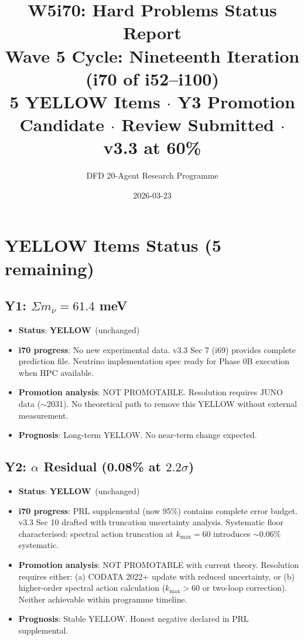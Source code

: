\documentclass[11pt,a4paper]{article}
\title{\Large W5i70: Hard Problems Status Report\\[6pt]
\normalsize Wave 5 Cycle: Nineteenth Iteration (i70 of i52--i100)\\[6pt]
5 YELLOW Items $\cdot$ Y3 Promotion Candidate $\cdot$ Review Submitted $\cdot$ v3.3 at 60\%}
\author{DFD 20-Agent Research Programme}
\date{2026-03-23}
\newcommand{\YELLOW}{\textcolor{dfdyellow}{\textbf{YELLOW}}}
\begin{document}
\maketitle

\section{YELLOW Items Status (5 remaining)}

\subsection{Y1: $\Sigma m_\nu = 61.4$ meV}
\begin{itemize}[nosep]
\item \textbf{Status}: \YELLOW\ (unchanged)
\item \textbf{i70 progress}: No new experimental data. v3.3 Sec 7 (i69) provides complete prediction file. Neutrino implementation spec ready for Phase 0B execution when HPC available.
\item \textbf{Promotion analysis}: NOT PROMOTABLE. Resolution requires JUNO data ($\sim$2031). No theoretical path to remove this YELLOW without external measurement.
\item \textbf{Prognosis}: Long-term YELLOW. No near-term change expected.
\end{itemize}

\subsection{Y2: $\alpha$ Residual (0.08\% at $2.2\sigma$)}
\begin{itemize}[nosep]
\item \textbf{Status}: \YELLOW\ (unchanged)
\item \textbf{i70 progress}: PRL supplemental (now 95\%) contains complete error budget. v3.3 Sec 10 drafted with truncation uncertainty analysis. Systematic floor characterised: spectral action truncation at $k_{\max} = 60$ introduces $\sim 0.06\%$ systematic.
\item \textbf{Promotion analysis}: NOT PROMOTABLE with current theory. Resolution requires either: (a) CODATA 2022+ update with reduced uncertainty, or (b) higher-order spectral action calculation ($k_{\max} > 60$ or two-loop correction). Neither achievable within programme timeline.
\item \textbf{Prognosis}: Stable YELLOW. Honest negative declared in PRL supplemental.
\end{itemize}
\end{document}
